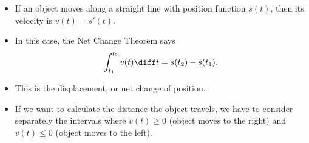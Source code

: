 \begin{frame}
\begin{itemize}
\item  If an object moves along a straight line with position function $s(t)$, then its velocity is $v(t) = s'(t)$.
\item  In this case, the Net Change Theorem says
\[
\int_{t_1}^{t_2} v(t) \diff t = s(t_2) - s(t_1).
\]
\item<2->  This is the displacement, or net change of position.
\item<3->  If we want to calculate the distance the object travels, we have to consider separately the intervals where $v(t) \geq 0$ (object moves to the right) and $v(t) \leq 0$ (object moves to the left).
\end{itemize}
\vspace{-.5cm}
\begin{columns}
%
%
\end{columns}
\end{frame}
